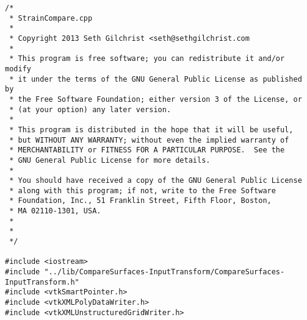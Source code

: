 \begin{lstlisting}
/*
 * StrainCompare.cpp
 *
 * Copyright 2013 Seth Gilchrist <seth@sethgilchrist.com
 *
 * This program is free software; you can redistribute it and/or modify
 * it under the terms of the GNU General Public License as published by
 * the Free Software Foundation; either version 3 of the License, or
 * (at your option) any later version.
 *
 * This program is distributed in the hope that it will be useful,
 * but WITHOUT ANY WARRANTY; without even the implied warranty of
 * MERCHANTABILITY or FITNESS FOR A PARTICULAR PURPOSE.  See the
 * GNU General Public License for more details.
 *
 * You should have received a copy of the GNU General Public License
 * along with this program; if not, write to the Free Software
 * Foundation, Inc., 51 Franklin Street, Fifth Floor, Boston,
 * MA 02110-1301, USA.
 *
 *
 */

#include <iostream>
#include "../lib/CompareSurfaces-InputTransform/CompareSurfaces-InputTransform.h"
#include <vtkSmartPointer.h>
#include <vtkXMLPolyDataWriter.h>
#include <vtkXMLUnstructuredGridWriter.h>


\end{lstlisting}
